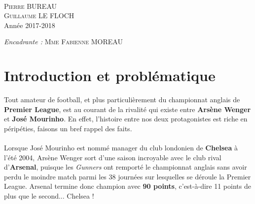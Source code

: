 \documentclass[14pt, openany]{article}
\begin{document}
\begin{titlepage}
\begin{center}
    \\[2cm]
    \begin{minipage}{0.4\textwidth}
      \begin{flushleft} \large
      	\textsc{Pierre BUREAU}\\
        \textsc{Guillaume LE FLOCH}\\
        Année 2017-2018\\
      \end{flushleft}
    \end{minipage}
    \begin{minipage}{0.4\textwidth}
      \begin{flushright} \large
        \emph{Encadrante : }\textsc{Mme Fabienne MOREAU}
      \end{flushright}
    \end{minipage}

    \vfill

\end{center}
\end{titlepage}
\tableofcontents

\newpage
\section{Introduction et problématique}
\paragraph{}
Tout amateur de football, et plus particulièrement du championnat anglais de \textbf{Premier League}, est au courant de la rivalité qui existe entre \textbf{Arsène Wenger} et \textbf{José Mourinho}. En effet, l'histoire entre nos deux protagonistes est riche en péripéties, faisons un bref rappel des faits.
\paragraph{}
Lorsque José Mourinho est nommé manager du club londonien de \textbf{Chelsea} à l'été 2004, Arsène Wenger sort d'une saison incroyable avec le club rival d'\textbf{Arsenal}, puisque les \textit{Gunners} ont remporté le championnat anglais sans avoir perdu le moindre match parmi les 38 journées sur lesquelles se déroule la Premier League. Arsenal termine donc champion avec \textbf{90 points}, c'est-à-dire 11 points de plus que le second... Chelsea !
\end{document}
